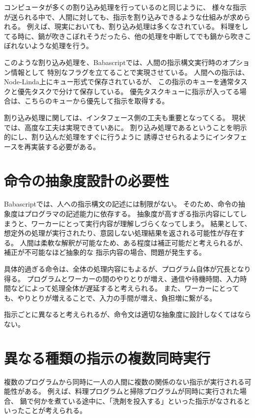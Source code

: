 コンピュータが多くの割り込み処理を行っているのと同じように、
様々な指示が送られる中で、人間に対しても、指示を割り込みできるような仕組みが求められる。
例えば、現実においても、割り込み処理は多くなされている。
料理をしてる時に、鍋が吹きこぼれそうだったら、他の処理を中断してでも鍋から吹きこぼれないような処理を行う。

このような割り込み処理を、Babascriptでは、人間の指示構文実行時のオプション情報として
特別なフラグを立てることで実現させている。
人間への指示は、Node-Linda上にキュー形式で保存されているが、
この指示のキューを通常タスクと優先タスクで分けて保存している。
優先タスクキューに指示が入ってる場合は、こちらのキューから優先して指示を取得する。

割り込み処理に関しては、インタフェース側の工夫も重要となってくる。
現状では、高度な工夫は実現できていあに。
割り込み処理であるということを明示的にし、割り込んだ処理をすぐに行うように
誘導させられるようにインタフェースを再実装する必要がある。

\section{命令の抽象度設計の必要性}\label{ux547dux4ee4ux306eux62bdux8c61ux5ea6ux8a2dux8a08ux306eux5fc5ux8981ux6027}

Babascriptでは、人への指示構文の記述には制限がない。
そのため、命令の抽象度はプログラマの記述能力に依存する。
抽象度が高すぎる指示内容にしてしまうと、ワーカーにとって実行内容が理解しづらくなってしまう。
結果として、想定外の処理が実行されたり、意図しない処理結果を返される可能性が存在する。
人間は柔軟な解釈が可能なため、ある程度は補正可能だと考えられるが、補正が不可能なほど抽象的な
指示内容の場合、問題が発生する。

具体的過ぎる命令は、全体の処理内容にもよるが、プログラム自体が冗長となり得る。
プログラムとワーカーの間のやりとりが増え、通信や待機時間、入力時間などによって処理全体が遅延すると考えられる。
また、ワーカーにとっても、やりとりが増えることで、入力の手間が増え、負担増に繋がる。

指示ごとに異なると考えられるが、命令文は適切な抽象度に設計しなくてはならない。

\section{異なる種類の指示の複数同時実行}\label{ux7570ux306aux308bux7a2eux985eux306eux6307ux793aux306eux8907ux6570ux540cux6642ux5b9fux884c}

複数のプログラムから同時に一人の人間に複数の関係のない指示が実行される可能性がある。
例えば、料理プログラムと掃除プログラムが同時に実行された場合、
鍋で何かを煮ている途中に、「洗剤を投入する」といった指示がなされるといったことが考えられる。

